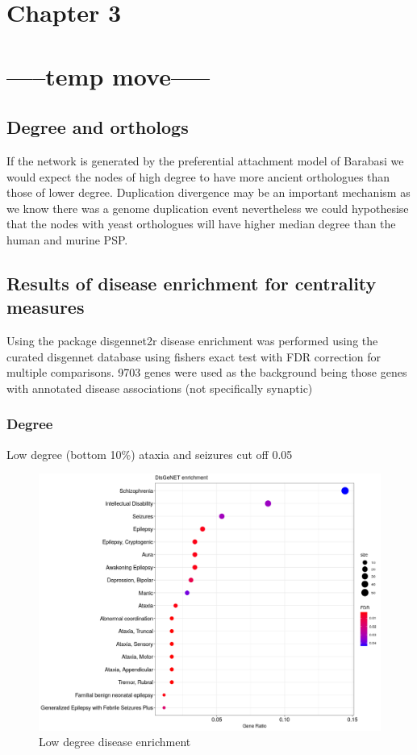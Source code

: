 \section{Chapter 3}
\section{-----temp move-----}

\subsection{Degree and orthologs}

If the network is generated by the preferential attachment model of Barabasi we would expect the nodes of high degree to have more ancient orthologues than those of lower degree.  Duplication divergence  may be an important mechanism as we know there was a genome duplication event nevertheless we could hypothesise that the nodes with yeast orthologues will have higher median degree than the human and murine PSP. 
\subsection{Results of disease enrichment for centrality measures}
\label{sec:disgennet2r tables}
Using the package disgennet2r disease enrichment was performed using the curated disgennet database using fishers exact test with FDR correction for multiple comparisons. 9703 genes were used as the background being those genes with annotated disease associations (not specifically synaptic)
\subsubsection{Degree}

Low degree (bottom 10\%) ataxia and seizures cut off 0.05

\begin{figure}
    \centering
    \includegraphics[width=\textwidth]{images/Rplot_low_deg_0point05cutoff_0point1cent_disgen.png}
    \caption{Low degree disease enrichment}
    \label{fig:low degree disease enrichment cut off 0.05}
\end{figure}


